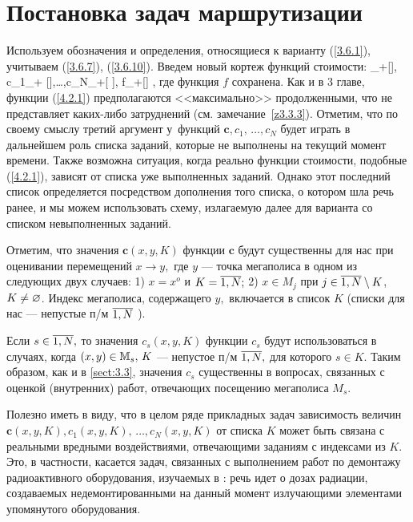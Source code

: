 
\section{
  Постановка задач маршрутизации
}
\label{sect:4.2}
\setcounter{equation}{0}

Используем обозначения и определения,
относящиеся к варианту
(\ref{3.6.1}),
учитываем (\ref{3.6.7}), (\ref{3.6.10}).
Введем новый кортеж функций стоимости:
\bfn
  \label{4.2.1}
  \in \car_+[\bbx\times \bbx\times {}], c_1\in \car_+
  [\bbx\times \bbx\times {}],\ldots,c_N\in \car_+[\bbx\times
  \bbx\times {}], f\in \car_+[\bbx]
  ,
\efn
где функция $f$ сохранена.
Как и в 3 главе,
функции (\ref{4.2.1})
предполагаются <<максимально>> продолженными,
что не представляет каких-либо затруднений
(см. замечание~\ref{z3.3.3}).
Отметим, что по своему смыслу третий аргумент у~функций
$\mathbf{c}, c_1,\,\ldots,c_N$ будет
играть в дальнейшем роль списка заданий,
которые  не выполнены на текущий момент времени.
Также возможна ситуация, когда реально функции стоимости,
подобные (\ref{4.2.1}),
зависят  от списка уже выполненных заданий.
Однако этот последний список определяется посредством дополнения того списка,
о котором шла речь ранее, и мы можем использовать схему,
излагаемую далее для варианта со списком невыполненных заданий.

Отметим,
что значения $\mathbf{c}(x,y,K)$
функции $\mathbf{c}$
будут существенны для нас при оценивании перемещений
$x\rightarrow y,$ где $y$ ---
точка мегаполиса в одном из следующих двух случаев:
1) $x= x^o$ и $K = \ov{1,N};$
2) $x\in M_j$ при $j\in \ov{1,N}\sm K$, $K\neq \varnothing$.
Индекс мегаполиса,
содержащего $y,$ включается в список $K$
(списки для нас --- непустые п/м $\ov{1,N}$ ).

Если $s\in \ov{1,N},$
то значения $c_s(x,y,K)$
функции $c_s$ будут
использоваться в случаях, когда $(x,y)\in {\mathbb M}_s,\, K$ ---
непустое п/м
$\ov{1,N},$
для которого $s\in K.$
Таким образом, как и в \ref{sect:3.3},
значения $c_s$ существенны в вопросах,
связанных с оценкой
(внутренних)
работ,
отвечающих посещению мегаполиса $M_s.$

Полезно иметь в виду,
что в целом ряде прикладных задач зависимость величин
$\mathbf{c}(x,y,K), c_1(x,y,K),\,\ldots,c_N(x,y,K)$
от списка $K$
может быть связана с реальными вредными воздействиями,
отвечающими заданиям с индексами из $K.$
Это, в частности, касается задач, связанных с выполнением
работ по демонтажу радиоактивного оборудования,
изучаемых в \cite{Cha2`}:
речь идет о дозах радиации,
создаваемых недемонтированными на данный момент
излучающими элементами упомянутого оборудования.

